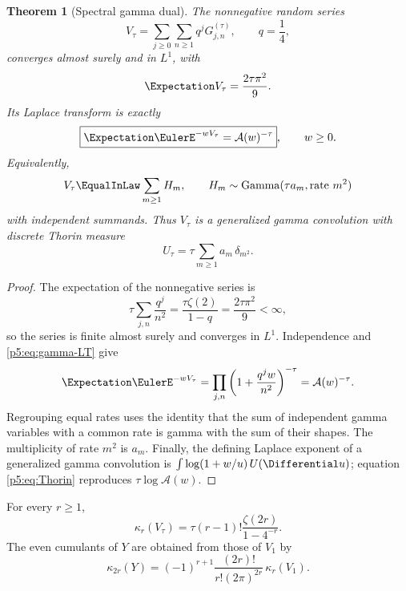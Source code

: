 \documentclass[11pt]{article}
\numberwithin{equation}{section}
\newtheorem{theorem}{Theorem}[section]
\theoremstyle{definition}
\theoremstyle{remark}
\begin{document}
\begin{theorem}[Spectral gamma dual]\label{p5:thm:gamma-dual}
The nonnegative random series
\begin{equation}\label{p5:eq:Vtau-layered}
 V_\tau=\sum_{j\ge0}\sum_{n\ge1}q^jG_{j,n}^{(\tau)},
 \qquad q=\frac14,
\end{equation}
converges almost surely and in $L^1$, with
\begin{equation}\label{p5:eq:V-mean}
 \Expectation V_\tau=\frac{2\tau\pi^2}{9}.
\end{equation}
Its Laplace transform is exactly
\begin{equation}\label{p5:eq:V-LT}
 \boxed{\Expectation\EulerE^{-wV_\tau}=\mathcal A(w)^{-\tau}},\qquad w\ge0.
\end{equation}
Equivalently,
\begin{equation}\label{p5:eq:V-grouped}
 V_\tau\EqualInLaw\sum_{m\ge1}H_m,
 \qquad
 H_m\sim\operatorname{Gamma}(\tau a_m,\text{rate }m^2)
\end{equation}
with independent summands.  Thus $V_\tau$ is a generalized gamma convolution
with discrete Thorin measure
\begin{equation}\label{p5:eq:Thorin}
 \boxed{U_\tau=\tau\sum_{m\ge1}a_m\,\delta_{m^2}.}
\end{equation}
\end{theorem}

\begin{proof}
The expectation of the nonnegative series is
\[
 \tau\sum_{j,n}\frac{q^j}{n^2}
 =\frac{\tau\zeta(2)}{1-q}=\frac{2\tau\pi^2}{9}<\infty,
\]
so the series is finite almost surely and converges in $L^1$.  Independence and
\cref{p5:eq:gamma-LT} give
\[
 \Expectation\EulerE^{-wV_\tau}
 =\prod_{j,n}\left(1+\frac{q^jw}{n^2}\right)^{-\tau}
 =\mathcal A(w)^{-\tau}.
\]
Regrouping equal rates uses the identity that the sum of independent gamma
variables with a common rate is gamma with the sum of their shapes.  The
multiplicity of rate $m^2$ is $a_m$.  Finally, the defining Laplace exponent of
a generalized gamma convolution is
$\int\log(1+w/u)\,U(\Differential u)$; equation \cref{p5:eq:Thorin} reproduces
$\tau\log\mathcal A(w)$.
\end{proof}

\begin{corollary}\label{p5:cor:V-cumulants}
For every $r\ge1$,
\begin{equation}\label{p5:eq:V-cumulants}
 \boxed{
 \kappa_r(V_\tau)=\tau(r-1)!\frac{\zeta(2r)}{1-4^{-r}}.}
\end{equation}
The even cumulants of $Y$ are obtained from those of $V_1$ by
\begin{equation}\label{p5:eq:cumulant-duality}
 \boxed{
 \kappa_{2r}(Y)=(-1)^{r+1}
 \frac{(2r)!}{r!(2\pi)^{2r}}\,\kappa_r(V_1).}
\end{equation}
\end{corollary}
\end{document}
